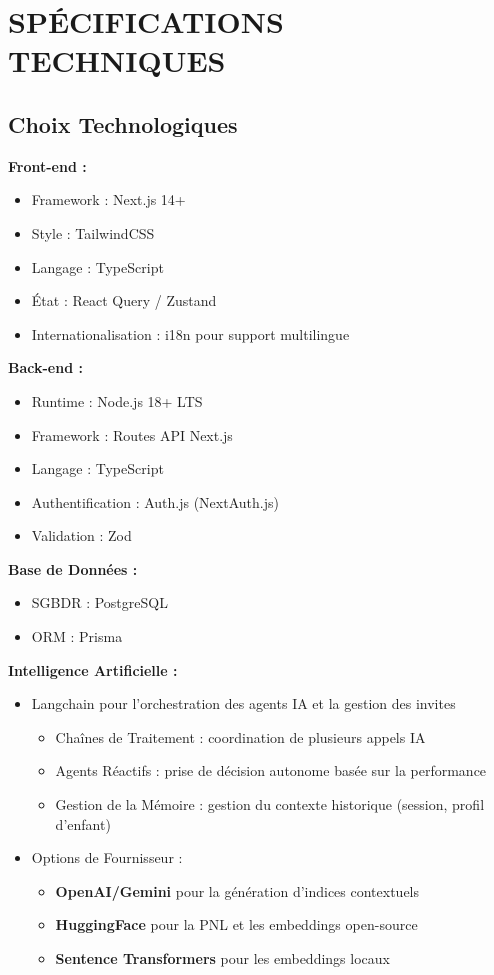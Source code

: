 \documentclass[12pt,a4paper]{article}
\begin{document}
\newpage

\section{SPÉCIFICATIONS TECHNIQUES}

\subsection{Choix Technologiques}

\textbf{Front-end :}
\begin{itemize}
    \item Framework : Next.js 14+
    \item Style : TailwindCSS
    \item Langage : TypeScript
    \item État : React Query / Zustand
    \item Internationalisation : i18n pour support multilingue
\end{itemize}

\textbf{Back-end :}
\begin{itemize}
    \item Runtime : Node.js 18+ LTS
    \item Framework : Routes API Next.js
    \item Langage : TypeScript
    \item Authentification : Auth.js (NextAuth.js)
    \item Validation : Zod
\end{itemize}

\textbf{Base de Données :}
\begin{itemize}
    \item SGBDR : PostgreSQL
    \item ORM : Prisma
\end{itemize}

\textbf{Intelligence Artificielle :}
\begin{itemize}
    \item Langchain pour l'orchestration des agents IA et la gestion des invites
    \begin{itemize}
        \item Chaînes de Traitement : coordination de plusieurs appels IA
        \item Agents Réactifs : prise de décision autonome basée sur la performance
        \item Gestion de la Mémoire : gestion du contexte historique (session, profil d'enfant)
    \end{itemize}
    \item Options de Fournisseur :
    \begin{itemize}
        \item \textbf{OpenAI/Gemini} pour la génération d'indices contextuels
        \item \textbf{HuggingFace} pour la PNL et les embeddings open-source
        \item \textbf{Sentence Transformers} pour les embeddings locaux
    \end{itemize}
\end{itemize}
\end{document}
